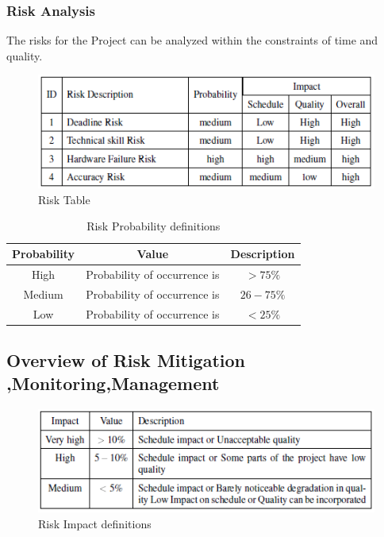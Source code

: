 \subsubsection{Risk Analysis}
The risks for the Project can be analyzed within the constraints of time and quality.

\begin{figure}[h!]
	\centering
	\includegraphics[width=.95\linewidth]{./r1}
		\caption{Risk Table}
	\label{fig:Risk Table}	
	\end{figure}


\begin{table}[htbp]
	\begin{center}
		\def\arraystretch{1.5}
		\begin{tabular}{| c | c | c |}
			\hline
			Probability & Value &	Description \\ \hline
			High &	Probability of occurrence is &  $ > 75 \% $ \\ \hline
			Medium &	Probability of occurrence is  & $26-75 \% $ \\ \hline
			Low	& Probability of occurrence is & $ < 25 \% $ \\ \hline
		\end{tabular}
	\end{center}
	\caption{Risk Probability definitions}
	\label{tab:riskdef}
\end{table}
\newpage
\subsection{Overview of Risk Mitigation ,Monitoring,Management}
\begin{figure}[h!]
	\centering
	\includegraphics[width=.95\linewidth]{./r2}
		\caption{Risk Impact definitions}
		\label{fig:Risk Impact definitions}	
	\end{figure}

